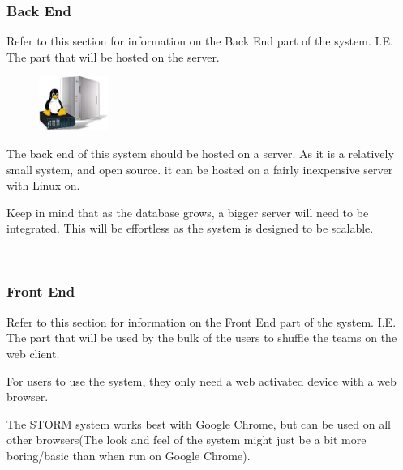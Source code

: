 \subsubsection{Back End}
	Refer to this section for information on the Back End part of the system. I.E. The part that will be hosted on the server.\par
	\vspace{0.3cm}
	
\begin{figure}
    \includegraphics[width=0.2\textwidth]{./graphics/LinuxServer.jpg}
\end{figure}

The back end of this system should be hosted on a server.
As it is a relatively small system, and open source. it can be hosted on a fairly inexpensive server with Linux on.

Keep in mind that as the database grows, a bigger server will need to be integrated.  This will be effortless as the system is designed to be scalable.

\\
\subsubsection{Front End}
	Refer to this section for information on the Front End part of the system. I.E. The part that will be 	used by the bulk of the users to shuffle the teams on the web client.\par
	\vspace{0.3cm}
	
For users to use the system, they only need a web activated device with a web browser.

The STORM system works best with Google Chrome, but can be used on all other browsers(The look and feel of the system might just be a bit more boring/basic than when run on Google Chrome).
